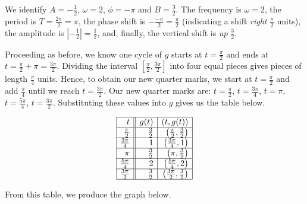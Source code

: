 \documentclass{ximera}
\begin{document}
\begin{example}
\begin{explanation}
\begin{enumerate}
We identify $A = -\frac{1}{2}$, $\omega = 2$, $\phi = -\pi$ and $B = \frac{3}{2}$.  The frequency is $\omega = 2$, the period is  $T=\frac{2\pi}{2} = \pi$,  the phase shift is $-\frac{-\pi}{2} = \frac{\pi}{2}$ (indicating a shift \textit{right} $\frac{\pi}{2}$ units), the amplitude is $\left| - \frac{1}{2} \right| = \frac{1}{2}$, and, finally,  the vertical shift is \textit{up} $\frac{3}{2}$. 


Proceeding as before, we know one cycle of $g$ starts at $t = \frac{\pi}{2}$ and ends at $t = \frac{\pi}{2} + \pi = \frac{3\pi}{2}$.  Dividing the interval $\left[ \frac{\pi}{2}, \frac{3 \pi}{2} \right]$ into four equal pieces  gives pieces of length  $\frac{\pi}{4}$ units.  Hence, to obtain our new quarter marks, we start at $t = \frac{\pi}{2}$ and add $\frac{\pi}{4}$ until we reach $t=\frac{3\pi}{2}$.   Our new quarter marks are:  $t = \frac{\pi}{2}$, $t = \frac{3\pi}{4}$, $t = \pi$, $t = \frac{5\pi}{4}$, $t = \frac{3\pi}{2}$.  Substituting these values into $g$ gives us the table below. 



\[ \begin{array}{|r||r|r|} \hline
t & g(t) & (t,g(t)) \\  \hline
\frac{\pi}{2} & \frac{3}{2} & \left(\frac{\pi}{2}, \frac{3}{2}\right)  \\    \hline
\frac{3\pi}{4} & 1 & \left(\frac{3\pi}{4} , 1 \right) \\  \hline 
\pi & \frac{3}{2} & \left(\pi , \frac{3}{2} \right)  \\  \hline 
\frac{5\pi}{4}  & 2 &  \left(\frac{5\pi}{4} , 2 \right) \\  \hline 
\frac{3\pi}{2} & \frac{3}{2} & \left(\frac{3\pi}{2}, \frac{3}{2} \right) \\   \hline
\end{array} \]


From this table, we produce the graph below.

\begin{image}
\end{image}
\end{enumerate}
\end{explanation}
\end{example}
\end{document}
